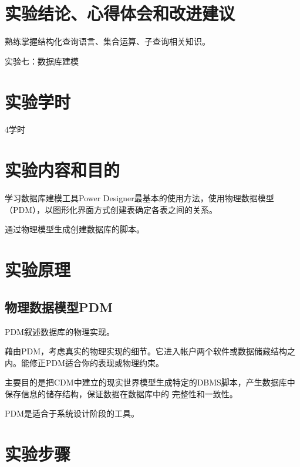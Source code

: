 \documentclass[a4paper]{uestcreport}
\begin{document}
\section{实验结论、心得体会和改进建议}
熟练掌握结构化查询语言、集合运算、子查询相关知识。

\newpage
\begin{center}
    \Large
    实验七：数据库建模
\end{center}

\setcounter{section}{0}
\section{实验学时}
4学时

\section{实验内容和目的}
学习数据库建模工具Power Designer最基本的使用方法，使用物理数据模型（PDM），以图形化界面方式创建表确定各表之间的关系。

通过物理模型生成创建数据库的脚本。

\section{实验原理}
\subsection{物理数据模型PDM}
PDM叙述数据库的物理实现。

藉由PDM，考虑真实的物理实现的细节。它进入帐户两个软件或数据储藏结构之内。能修正PDM适合你的表现或物理约束。

主要目的是把CDM中建立的现实世界模型生成特定的DBMS脚本，产生数据库中保存信息的储存结构，保证数据在数据库中的
完整性和一致性。

PDM是适合于系统设计阶段的工具。

\section{实验步骤}
\end{document}
